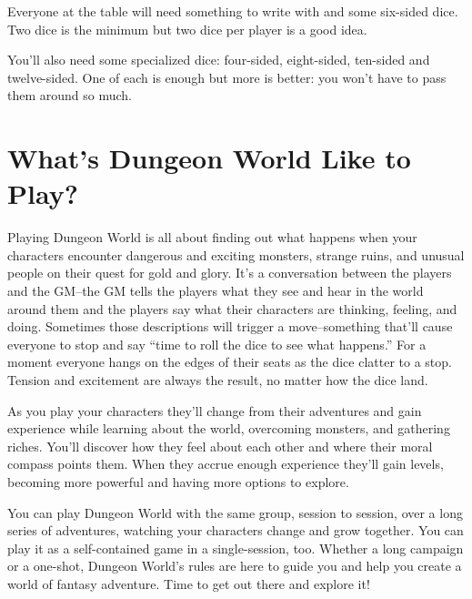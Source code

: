  Everyone at the table will need something to write with and some six-sided dice. Two dice is the minimum but two dice per player is a good idea.


 You'll also need some specialized dice: four-sided, eight-sided, ten-sided and twelve-sided. One of each is enough but more is better: you won't have to pass them around so much.
\section*{What's Dungeon World Like to Play?}


 Playing Dungeon World is all about finding out what happens when your characters encounter dangerous and exciting monsters, strange ruins, and unusual people on their quest for gold and glory. It's a conversation between the players and the GM--the GM tells the players what they see and hear in the world around them and the players say what their characters are thinking, feeling, and doing. Sometimes those descriptions will trigger a move--something that'll cause everyone to stop and say ``time to roll the dice to see what happens.'' For a moment everyone hangs on the edges of their seats as the dice clatter to a stop. Tension and excitement are always the result, no matter how the dice land.


 As you play your characters they'll change from their adventures and gain experience while learning about the world, overcoming monsters, and gathering riches. You'll discover how they feel about each other and where their moral compass points them. When they accrue enough experience they'll gain levels, becoming more powerful and having more options to explore.


 You can play Dungeon World with the same group, session to session, over a long series of adventures, watching your characters change and grow together. You can play it as a self-contained game in a single-session, too. Whether a long campaign or a one-shot, Dungeon World's rules are here to guide you and help you create a world of fantasy adventure. Time to get out there and explore it!

